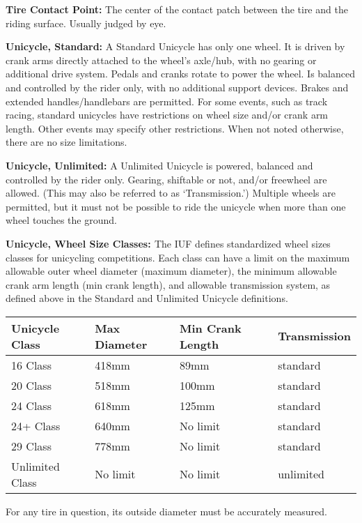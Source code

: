 \textbf{Tire Contact Point:} The center of the contact patch between the tire and the riding surface.
Usually judged by eye.

\textbf{Unicycle, Standard:} A Standard Unicycle has only one wheel.
It is driven by crank arms directly attached to the wheel's axle/hub, with no gearing or additional drive system.
Pedals and cranks rotate to power the wheel.
Is balanced and controlled by the rider only, with no additional support devices.
Brakes and extended handles/handlebars are permitted.
For some events, such as track racing, standard unicycles have restrictions on wheel size and/or crank arm length.
Other events may specify other restrictions.
When not noted otherwise, there are no size limitations.

\textbf{Unicycle, Unlimited:} A Unlimited Unicycle is powered, balanced and controlled by the rider only.
Gearing, shiftable or not, and/or freewheel are allowed.
(This may also be referred to as `Transmission.')
Multiple wheels are permitted, but it must not be possible to ride the unicycle when more than one wheel touches the ground.

\textbf{Unicycle, Wheel Size Classes: \label{def:general_terminology_wheel-size-classes}}
The IUF defines standardized wheel sizes classes for unicycling competitions. Each class can have a limit on the maximum allowable outer wheel diameter (maximum diameter), the minimum allowable crank arm length (min crank length), and allowable transmission system, as defined above in the Standard and Unlimited Unicycle definitions.

\begin{longtable}{|p{3cm}|p{3cm}|p{4cm}|p{3cm}|}
\hline
\textbf{Unicycle Class} & \textbf{Max Diameter} & \textbf{Min Crank Length} & \textbf{Transmission}\\
\hline
16 Class & 418mm & 89mm & standard \\
\hline
20 Class & 518mm & 100mm & standard \\
\hline
24 Class & 618mm & 125mm & standard \\
\hline
24+ Class & 640mm & No limit & standard \\
\hline
29 Class & 778mm & No limit & standard \\
\hline
Unlimited Class & No limit & No limit & unlimited \\
\hline
\end{longtable}

For any tire in question, its outside diameter must be accurately measured.

